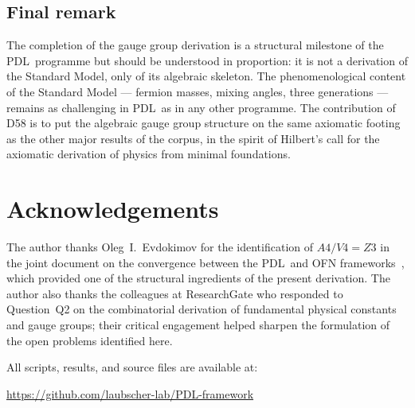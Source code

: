 \documentclass[11pt,a4paper]{article}
\def\Vfour{V4}%
\def\Afour{A4}%
\def\Zthree{Z3}%
\def\PDL{PDL}%
\def\cong{=}%
\def\mathbb#1{#1}%
\def\textsc#1{#1}%
\theoremstyle{plain}
\theoremstyle{definition}
\theoremstyle{remark}
\newcommand{\PDL}{\textsc{PDL}}
\newcommand{\Afour}{A_4}
\newcommand{\Vfour}{V_4}
\newcommand{\Zthree}{\mathbb{Z}_3}
\begin{document}
\subsection{Final remark}

The completion of the gauge group derivation is a structural milestone of the \PDL\ programme but should be understood in proportion: it is not a derivation of the Standard Model, only of its algebraic skeleton. The phenomenological content of the Standard Model --- fermion masses, mixing angles, three generations --- remains as challenging in \PDL\ as in any other programme. The contribution of D58 is to put the algebraic gauge group structure on the same axiomatic footing as the other major results of the corpus, in the spirit of Hilbert's call for the axiomatic derivation of physics from minimal foundations.

\section*{Acknowledgements}

The author thanks Oleg~I.~Evdokimov for the identification of $\Afour/\Vfour \cong \Zthree$ in the joint document on the convergence between the \PDL\ and OFN frameworks~\cite{Evdokimov_TwoRoads}, which provided one of the structural ingredients of the present derivation. The author also thanks the colleagues at ResearchGate who responded to Question~Q2 on the combinatorial derivation of fundamental physical constants and gauge groups; their critical engagement helped sharpen the formulation of the open problems identified here.

\vspace{0.5em}

All scripts, results, and source files are available at:
\begin{center}
\url{https://github.com/laubscher-lab/PDL-framework}
\end{center}

\clearpage


\end{document}
